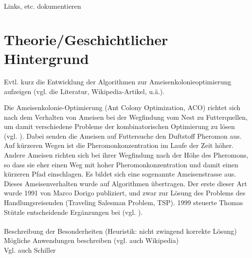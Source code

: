 Links, etc. dokumentieren


\vspace*{1cm}


\section{Theorie/Geschichtlicher Hintergrund} 

Evtl. kurz die Entwicklung der Algorithmen zur Ameisenkolonieoptimierung aufzeigen (vgl. die Literatur, Wikipedia-Artikel, u.ä.).


Die Ameisenkolonie-Optimierung (Ant Colony Optimization, ACO) richtet sich nach dem Verhalten von Ameisen bei der Wegfindung vom Nest zu Futterquellen, um damit verschiedene Probleme der kombinatorischen Optimierung zu lösen (vgl. \cite[S. 1]{sch-koa}). Dabei senden die Ameisen auf Futtersuche den Duftstoff Pheromon aus. Auf kürzeren Wegen ist die Pheromonkonzentration im Laufe der Zeit höher. Andere Ameisen richten sich bei ihrer Wegfindung nach der Höhe des Pheromons, so dass sie eher einen Weg mit hoher Pheromonkonzentration und damit einen kürzeren Pfad einschlagen. Es bildet sich eine sogenannte Ameisenstrasse aus.
Dieses Ameisenverhalten wurde auf Algorithmen übertragen. Der erste dieser Art wurde 1991 von Marco Dorigo publiziert, und zwar zur Lösung des Problems des Handlungsreisenden (Traveling Salesman Problem, TSP). 1999 steuerte Thomas Stützle entscheidende Ergänzungen bei (vgl. \cite{ds-ant}). \\\\

Beschreibung der Besonderheiten (Heuristik: nicht zwingend korrekte Lösung) \\

Mögliche Anwendungen beschreiben (vgl. auch Wikipedia) \\

Vgl. auch Schiller


\vspace*{1cm}
